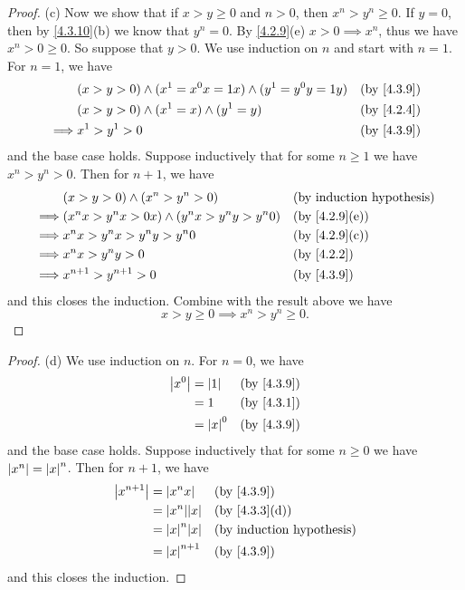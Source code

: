 \begin{proof}{(c)}
  Now we show that if \(x > y \geq 0\) and \(n > 0\), then \(x^n > y^n \geq 0\).
  If \(y = 0\), then by \cref{4.3.10}(b) we know that \(y^n = 0\).
  By \cref{4.2.9}(e) \(x > 0 \implies x^n\), thus we have \(x^n > 0 \geq 0\).
  So suppose that \(y > 0\).
  We use induction on \(n\) and start with \(n = 1\).
  For \(n = 1\), we have
  \begin{align*}
             & (x > y > 0) \land (x^1 = x^0 x = 1x) \land (y^1 = y^0 y = 1y) &  & \by{4.3.9} \\
             & (x > y > 0) \land (x^1 = x) \land (y^1 = y)                   &  & \by{4.2.4} \\
    \implies & x^1 > y^1 > 0                                                 &  & \by{4.3.9}
  \end{align*}
  and the base case holds.
  Suppose inductively that for some \(n \geq 1\) we have \(x^n > y^n > 0\).
  Then for \(n + 1\), we have
  \begin{align*}
             & (x > y > 0) \land (x^n > y^n > 0)                  &  & \byIH                       \\
    \implies & (x^n x > y^n x > 0x) \land (y^n x > y^n y > y^n 0) &  & \text{(by \cref{4.2.9}(e))} \\
    \implies & x^n x > y^n x > y^n y > y^n 0                      &  & \text{(by \cref{4.2.9}(c))} \\
    \implies & x^n x > y^n y > 0                                  &  & \by{4.2.2}                  \\
    \implies & x^{n + 1} > y^{n + 1} > 0                          &  & \by{4.3.9}
  \end{align*}
  and this closes the induction.
  Combine with the result above we have
  \[
    x > y \geq 0 \implies x^n > y^n \geq 0.
  \]
\end{proof}

\begin{proof}{(d)}
  We use induction on \(n\).
  For \(n = 0\), we have
  \begin{align*}
    \abs{x^0} & = \abs{1}   &  & \by{4.3.9} \\
              & = 1         &  & \by{4.3.1} \\
              & = \abs{x}^0 &  & \by{4.3.9}
  \end{align*}
  and the base case holds.
  Suppose inductively that for some \(n \geq 0\) we have \(\left\lvert x^n\right\rvert = \left\lvert x\right\rvert^n\).
  Then for \(n + 1\), we have
  \begin{align*}
    \abs{x^{n + 1}} & = \abs{x^n x}       &  & \by{4.3.9}                  \\
                    & = \abs{x^n} \abs{x} &  & \text{(by \cref{4.3.3}(d))} \\
                    & = \abs{x}^n \abs{x} &  & \byIH                       \\
                    & = \abs{x}^{n + 1}   &  & \by{4.3.9}
  \end{align*}
  and this closes the induction.
\end{proof}

